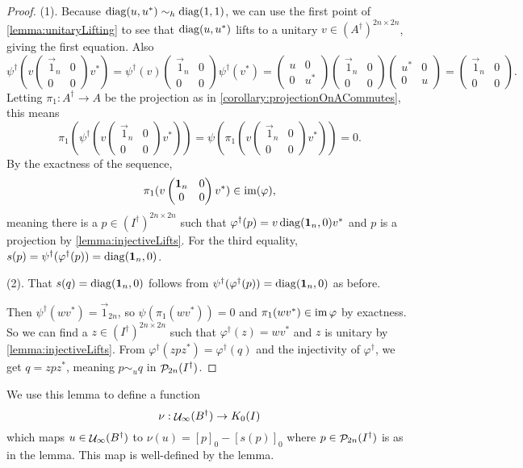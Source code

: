 \begin{proof}
(1). Because $\operatorname{diag}(u,u^*)\sim_h \operatorname{diag}(1,1)$, we can use the first point of \ref{lemma:unitaryLifting} to see that $\operatorname{diag}(u,u^*)$ lifts to a unitary $v\in (A^\dagger)^{2n\times 2n}$, giving the first equation. Also
\[ \psi^\dagger( v \begin{pmatrix}
\vec{1}_n & 0 \\ 0 & 0
\end{pmatrix}v^* ) = \psi^\dagger(v) \begin{pmatrix}
\vec{1}_n & 0 \\ 0 & 0
\end{pmatrix} \psi^\dagger(v^*) = \begin{pmatrix}
u & 0 \\ 0 & u^*
\end{pmatrix}\begin{pmatrix}
\vec{1}_n & 0 \\ 0 & 0
\end{pmatrix}\begin{pmatrix}
u^* & 0 \\ 0 & u
\end{pmatrix} = \begin{pmatrix}
\vec{1}_n & 0 \\ 0 & 0
\end{pmatrix}. \]
Letting $\pi_1: A^\dagger \to A$ be the projection as in \ref{corollary:projectionOnACommutes}, this means
\[ \pi_1(\psi^\dagger( v \begin{pmatrix}
\vec{1}_n & 0 \\ 0 & 0
\end{pmatrix}v^* )) = \psi(\pi_1( v \begin{pmatrix}
\vec{1}_n & 0 \\ 0 & 0
\end{pmatrix}v^* )) = 0. \]
By the exactness of the sequence, 
\[ \pi_1( v \begin{pmatrix}
\bm{\mathrm{1}}_n & 0 \\ 0 & 0
\end{pmatrix}v^* ) \in \operatorname{im} (\varphi), \]
meaning there is a $p\in (I^\dagger)^{2n\times 2n}$ such that $\varphi^\dagger(p) = v\operatorname{diag}(\bm{\mathrm{1}}_n,0)v^*$ and $p$ is a projection by \ref{lemma:injectiveLifts}.
For the third equality, $s(p) = \psi^\dagger(\varphi^\dagger(p)) = \operatorname{diag}(\bm{\mathrm{1}}_n, 0)$.

(2). That $s(q) = \operatorname{diag}(\bm{\mathrm{1}}_n, 0)$ follows from $\psi^\dagger(\varphi^\dagger(p)) = \operatorname{diag}(\bm{\mathrm{1}}_n, 0)$ as before.

Then $\psi^\dagger(wv^*) = \vec{1}_{2n}$, so $\psi(\pi_1(wv^*)) = 0$ and $\pi_1(wv^*)\in \operatorname{im}\varphi$ by exactness. So we can find a $z\in (I^\dagger)^{2n\times 2n}$ such that $\varphi^\dagger(z) = wv^*$ and $z$ is unitary by \ref{lemma:injectiveLifts}. From $\varphi^\dagger(zpz^*) = \varphi^\dagger(q)$ and the injectivity of $\varphi^\dagger$, we get $q = zpz^*$, meaning $p \sim_u q$ in $\mathop{\mathcal{P}}\nolimits_{2n}(I^\dagger)$.
\end{proof}
We use this lemma to define a function
\[ \nu: \mathop{\mathcal{U}}\nolimits_\infty(B^\dagger)\to K_0(I) \]
which maps $u\in\mathop{\mathcal{U}}\nolimits_\infty(B^\dagger)$ to $\nu(u) = [p]_0 - [s(p)]_0$ where $p\in\mathop{\mathcal{P}}\nolimits_{2n}(I^\dagger)$ is as in the lemma. This map is well-defined by the lemma.

